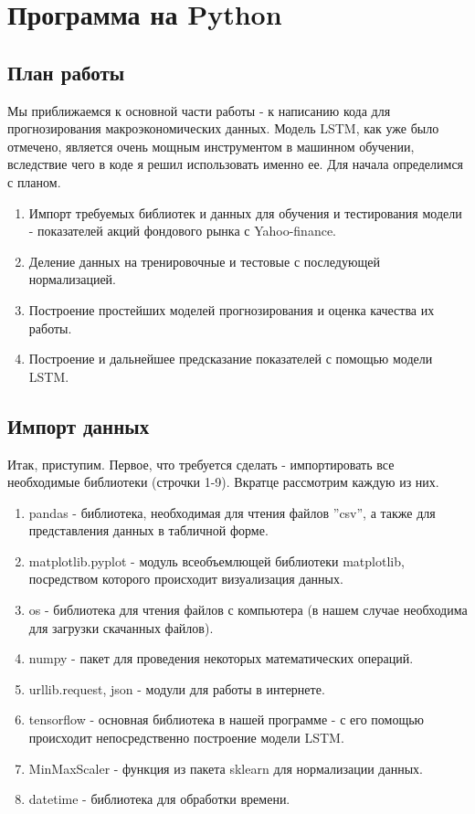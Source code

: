 \documentclass[12pt, a4paper]{article}
\begin{document}
\section{Программа на Python}

\subsection{План работы}

Мы приближаемся к основной части работы - к написанию кода для прогнозирования макроэкономических данных. Модель LSTM, как уже было отмечено, является очень мощным инструментом в машинном обучении, вследствие чего в коде я решил использовать именно ее. Для начала определимся с планом.
\begin{enumerate}
	\item Импорт требуемых библиотек и данных для обучения и тестирования модели - показателей акций фондового рынка с Yahoo-finance.
	\item Деление данных на тренировочные и тестовые с последующей нормализацией.
	\item Построение простейших моделей прогнозирования и оценка качества их работы.
	\item Построение и дальнейшее предсказание показателей с помощью модели LSTM.
\end{enumerate}

\subsection{Импорт данных}

Итак, приступим. Первое, что требуется сделать - импортировать все необходимые библиотеки (строчки 1-9). Вкратце рассмотрим каждую из них.
\begin{enumerate}
	\item pandas - библиотека, необходимая для чтения файлов ''csv'', а также для представления данных в табличной форме.
	\item matplotlib.pyplot - модуль всеобъемлющей библиотеки matplotlib, посредством которого происходит визуализация данных.
	\item os - библиотека для чтения файлов с компьютера (в нашем случае необходима для загрузки скачанных файлов).
	\item numpy - пакет для проведения некоторых математических операций.
	\item urllib.request, json - модули для работы в интернете.
	\item tensorflow - основная библиотека в нашей программе - с его помощью происходит непосредственно построение модели LSTM.
	\item MinMaxScaler - функция из пакета sklearn для нормализации данных.
	\item datetime - библиотека для обработки времени.
\end{enumerate}
\end{document}
